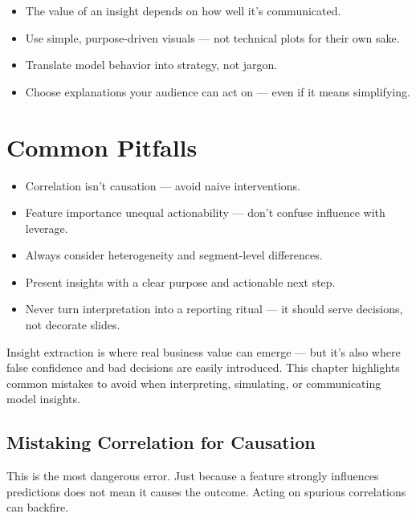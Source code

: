 \documentclass[12pt,openany]{book}
\begin{document}
\begin{summarybox}
\begin{itemize}
  \item The value of an insight depends on how well it’s communicated.
  \item Use simple, purpose-driven visuals — not technical plots for their own sake.
  \item Translate model behavior into strategy, not jargon.
  \item Choose explanations your audience can act on — even if it means simplifying.
\end{itemize}
\end{summarybox}




\chapter{Common Pitfalls}

\begin{summarybox}
\begin{itemize}
  \item Correlation isn’t causation — avoid naive interventions.
  \item Feature importance unequal actionability — don’t confuse influence with leverage.
  \item Always consider heterogeneity and segment-level differences.
  \item Present insights with a clear purpose and actionable next step.
  \item Never turn interpretation into a reporting ritual — it should serve decisions, not decorate slides.
\end{itemize}
\end{summarybox}

Insight extraction is where real business value can emerge — but it’s also where false confidence and bad decisions are easily introduced. This chapter highlights common mistakes to avoid when interpreting, simulating, or communicating model insights.



\section{Mistaking Correlation for Causation}

This is the most dangerous error. Just because a feature strongly influences predictions does not mean it causes the outcome. Acting on spurious correlations can backfire.
\end{document}
